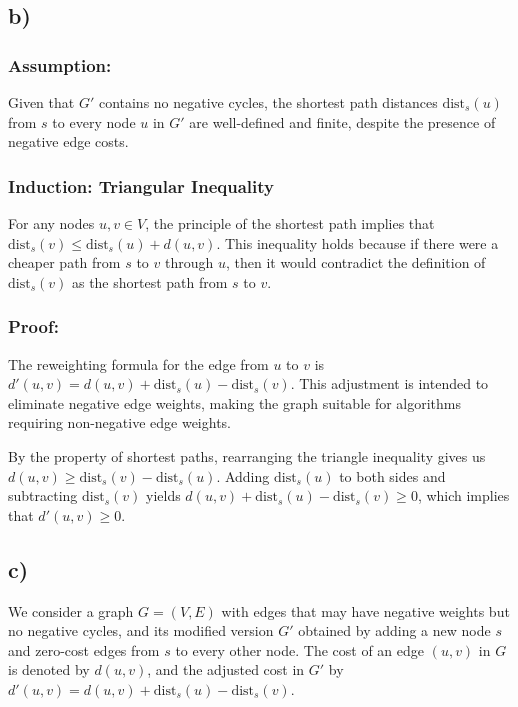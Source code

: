 \documentclass{article}
\begin{document}
\subsection{b)}

\subsubsection{Assumption:} Given that $G'$ contains no negative cycles, the shortest path distances $\text{dist}_s(u)$ from $s$ to every node $u$ in $G'$ are well-defined and finite, despite the presence of negative edge costs.\par
\subsubsection{Induction: Triangular Inequality}
For any nodes $u, v \in V$, the principle of the shortest path implies that $\text{dist}_s(v) \leq \text{dist}_s(u) + d(u, v)$. This inequality holds because if there were a cheaper path from $s$ to $v$ through $u$, then it would contradict the definition of $\text{dist}_s(v)$ as the shortest path from $s$ to $v$.


\subsubsection{Proof: }
The reweighting formula for the edge from $u$ to $v$ is $d'(u, v) = d(u, v) + \text{dist}_s(u) - \text{dist}_s(v)$. This adjustment is intended to eliminate negative edge weights, making the graph suitable for algorithms requiring non-negative edge weights.


By the property of shortest paths, rearranging the triangle inequality gives us $d(u, v) \geq \text{dist}_s(v) - \text{dist}_s(u)$. Adding $\text{dist}_s(u)$ to both sides and subtracting $\text{dist}_s(v)$ yields $d(u, v) + \text{dist}_s(u) - \text{dist}_s(v) \geq 0$, which implies that $d'(u, v) \geq 0$.

\subsection{c)}


We consider a graph $G = (V, E)$ with edges that may have negative weights but no negative cycles, and its modified version $G'$ obtained by adding a new node $s$ and zero-cost edges from $s$ to every other node. The cost of an edge $(u, v)$ in $G$ is denoted by $d(u, v)$, and the adjusted cost in $G'$ by $d'(u, v) = d(u, v) + \text{dist}_s(u) - \text{dist}_s(v)$. 
\end{document}
